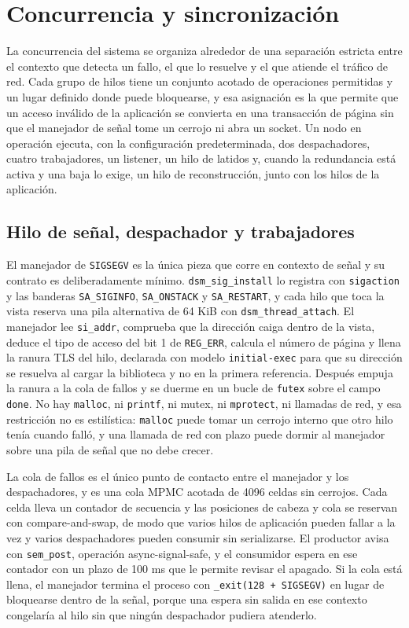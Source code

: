 \section{Concurrencia y sincronización}\label{sec:concurrencia}

La concurrencia del sistema se organiza alrededor de una separación estricta entre el contexto que detecta un fallo, el que lo resuelve y el que atiende el tráfico de red. Cada grupo de hilos tiene un conjunto acotado de operaciones permitidas y un lugar definido donde puede bloquearse, y esa asignación es la que permite que un acceso inválido de la aplicación se convierta en una transacción de página sin que el manejador de señal tome un cerrojo ni abra un socket. Un nodo en operación ejecuta, con la configuración predeterminada, dos despachadores, cuatro trabajadores, un listener, un hilo de latidos y, cuando la redundancia está activa y una baja lo exige, un hilo de reconstrucción, junto con los hilos de la aplicación.

\subsection{Hilo de señal, despachador y trabajadores}

El manejador de \texttt{SIGSEGV} es la única pieza que corre en contexto de señal y su contrato es deliberadamente mínimo. \texttt{dsm\_sig\_install} lo registra con \texttt{sigaction} y las banderas \texttt{SA\_SIGINFO}, \texttt{SA\_ONSTACK} y \texttt{SA\_RESTART}, y cada hilo que toca la vista reserva una pila alternativa de 64 KiB con \texttt{dsm\_thread\_attach}. El manejador lee \texttt{si\_addr}, comprueba que la dirección caiga dentro de la vista, deduce el tipo de acceso del bit 1 de \texttt{REG\_ERR}, calcula el número de página y llena la ranura TLS del hilo, declarada con modelo \texttt{initial-exec} para que su dirección se resuelva al cargar la biblioteca y no en la primera referencia. Después empuja la ranura a la cola de fallos y se duerme en un bucle de \texttt{futex} sobre el campo \texttt{done}. No hay \texttt{malloc}, ni \texttt{printf}, ni mutex, ni \texttt{mprotect}, ni llamadas de red, y esa restricción no es estilística: \texttt{malloc} puede tomar un cerrojo interno que otro hilo tenía cuando falló, y una llamada de red con plazo puede dormir al manejador sobre una pila de señal que no debe crecer.

La cola de fallos es el único punto de contacto entre el manejador y los despachadores, y es una cola MPMC acotada de 4096 celdas sin cerrojos. Cada celda lleva un contador de secuencia y las posiciones de cabeza y cola se reservan con compare-and-swap, de modo que varios hilos de aplicación pueden fallar a la vez y varios despachadores pueden consumir sin serializarse. El productor avisa con \texttt{sem\_post}, operación async-signal-safe, y el consumidor espera en ese contador con un plazo de 100 ms que le permite revisar el apagado. Si la cola está llena, el manejador termina el proceso con \texttt{\_exit(128 + SIGSEGV)} en lugar de bloquearse dentro de la señal, porque una espera sin salida en ese contexto congelaría al hilo sin que ningún despachador pudiera atenderlo.

